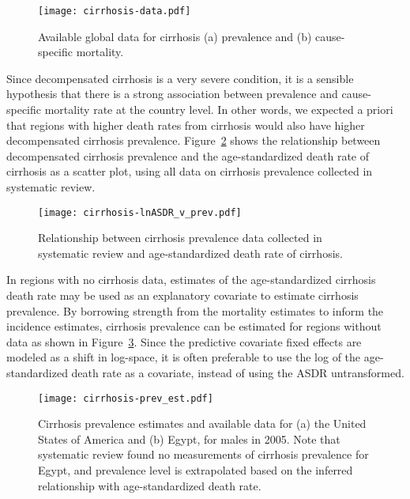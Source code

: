     \begin{figure}[h]
        \begin{center}
            \texttt{[image: cirrhosis-data.pdf]}
            \caption{Available global data for cirrhosis (a) prevalence
              and (b) cause-specific mortality.}
            \label{fig:app-cirrhosis data}
        \end{center}
    \end{figure}

Since decompensated cirrhosis is a very severe condition, it is a
sensible hypothesis that there is a strong association between
prevalence and cause-specific mortality rate at the country level.  In
other words, we expected a priori that regions with higher death rates
from cirrhosis would also have higher decompensated cirrhosis prevalence.
Figure~\ref{fig:app-cirrhosis asp} shows the relationship between decompensated cirrhosis
prevalence and the age-standardized death rate of cirrhosis as a
scatter plot, using all data on cirrhosis prevalence collected in
systematic review.

    \begin{figure}[h]
        \begin{center}
            \texttt{[image: cirrhosis-lnASDR\_v\_prev.pdf]}
            \caption{Relationship between cirrhosis prevalence data
              collected in systematic review and age-standardized
              death rate of cirrhosis.}
            \label{fig:app-cirrhosis asp}
        \end{center}
    \end{figure}

In regions with no cirrhosis data, estimates of the age-standardized
cirrhosis death rate may be used as an explanatory covariate to
estimate cirrhosis prevalence.  By borrowing strength from the
mortality estimates to inform the incidence estimates, cirrhosis
prevalence can be estimated for regions without data as shown in
Figure~\ref{fig:app-cirrhosis prev est}.  Since the predictive
covariate fixed effects are modeled as a shift in log-space, it is
often preferable to use the log of the age-standardized death rate as
a covariate, instead of using the ASDR untransformed.

    \begin{figure}[h]
        \begin{center}
            \texttt{[image: cirrhosis-prev\_est.pdf]}
            \caption{Cirrhosis prevalence estimates and available data
              for (a) the United States of America and (b) Egypt, for males
              in 2005. Note that systematic review found no
              measurements of cirrhosis prevalence for Egypt, and
              prevalence level is extrapolated based on the inferred
              relationship with age-standardized death rate.}
            \label{fig:app-cirrhosis prev est}
        \end{center}
    \end{figure}

